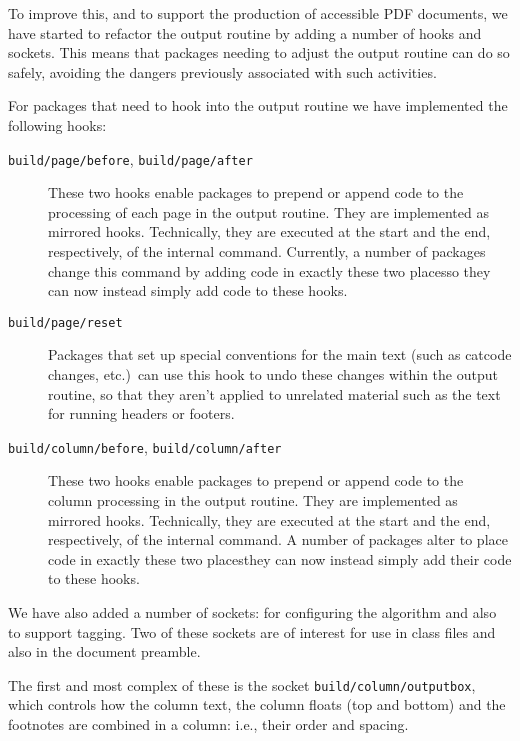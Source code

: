 \documentclass{ltnews}
\providecommand\Dash {\unskip \textemdash}
\providecommand\hook[1]{\texttt{#1}}
\providecommand\socket[1]{\texttt{#1}}
\begin{document}
To improve this, and to support the production of accessible PDF
documents, we have started to refactor the output routine by adding a
number of hooks and sockets.  This means that packages needing to
adjust the output routine can do so safely, avoiding the dangers
previously associated with such activities.


For packages that need to hook into the output routine we have implemented
the following hooks:
\begin{description}

\item[\hook{build/page/before}, \hook{build/page/after}]

   These two hooks enable packages to prepend or append code to the
   processing of each page in the output routine. They are implemented
   as mirrored hooks.  Technically, they are executed at the start and
   the end, respectively, of the internal \LaTeXe{} 
   command.  Currently, a number of packages change this command by
   adding code in exactly these two places\Dash so they can now
   instead simply add code to these hooks.

 \item[\hook{build/page/reset}]

   Packages that set up special conventions for the main text (such as
   catcode changes, etc.)\ can use this hook to undo these changes
   within the output routine, so that they aren't applied to unrelated
   material such as the text for running headers or footers.

\item[\hook{build/column/before}, \hook{build/column/after}]

  These two hooks enable packages to prepend or append code to the
  column processing in the output routine. They are implemented as
  mirrored hooks.  Technically, they are executed at the start and the
  end, respectively, of the internal \LaTeXe{}  command.
  A number of packages alter  to place code in exactly
  these two places\Dash they can now instead simply add their code to
  these hooks.
  
\end{description}

We have also added a number of sockets: for configuring the algorithm
and also to support tagging.  Two of these sockets are of interest for
use in class files and also in the document preamble.

The first and most complex of these is the socket
\socket{build/column/outputbox}, which controls how the column text,
the column floats (top and bottom) and the footnotes are combined in a
column: i.e., their order and spacing.
\end{document}
